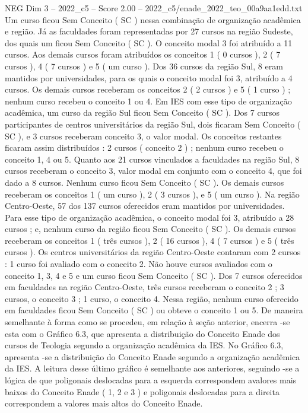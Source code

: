 \begin{textsample}{NEG Dim 3 – 2022\_c5 – Score 2.00 – 2022\_c5/enade\_2022\_teo\_00a9aa1edd.txt}
Um curso ficou Sem Conceito ( SC ) nessa combinação de organização acadêmica e região.
Já as faculdades foram representadas por 27 cursos na região Sudeste, dos quais um ficou Sem Conceito ( SC ).
O conceito modal 3 foi atribuído a 11 cursos.
Aos demais cursos foram atribuídos os conceitos 1 ( 0 cursos ), 2 ( 7 cursos ), 4 ( 7 cursos ) e 5 ( um curso ).
Dos 36 cursos da região Sul, 8 eram mantidos por universidades, para os quais o conceito modal foi 3, atribuído a 4 cursos.
Os demais cursos receberam os conceitos 2 ( 2 cursos ) e 5 ( 1 curso ) ; nenhum curso recebeu o conceito 1 ou 4.
Em IES com esse tipo de organização acadêmica, um curso da região Sul ficou Sem Conceito ( SC ).
Dos 7 cursos participantes de centros universitários da região Sul, dois ficaram Sem Conceito ( SC ), e 3 cursos receberam conceito 3, o valor modal.
Os conceitos restantes ficaram assim distribuídos : 2 cursos ( conceito 2 ) ; nenhum curso recebeu o conceito 1, 4 ou 5.
Quanto aos 21 cursos vinculados a faculdades na região Sul, 8 cursos receberam o conceito 3, valor modal em conjunto com o conceito 4, que foi dado a 8 cursos.
Nenhum curso ficou Sem Conceito ( SC ).
Os demais cursos receberam os conceitos 1 ( um curso ), 2 ( 3 cursos ), e 5 ( um curso ).
Na região Centro-Oeste, 57 dos 137 cursos oferecidos eram mantidos por universidades.
Para esse tipo de organização acadêmica, o conceito modal foi 3, atribuído a 28 cursos ; e, nenhum curso da região ficou Sem Conceito ( SC ).
Os demais cursos receberam os conceitos 1 ( três cursos ), 2 ( 16 cursos ), 4 ( 7 cursos ) e 5 ( três cursos ).
Os centros universitários da região Centro-Oeste contaram com 2 cursos : 1 curso foi avaliado com o conceito 2.
Não houve cursos avaliados com o conceito 1, 3, 4 e 5 e um curso ficou Sem Conceito ( SC ).
Dos 7 cursos oferecidos em faculdades na região Centro-Oeste, três cursos receberam o conceito 2 ; 3 cursos, o conceito 3 ; 1 curso, o conceito 4.
Nessa região, nenhum curso oferecido em faculdades ficou Sem Conceito ( SC ) ou obteve o conceito 1 ou 5.
De maneira semelhante à forma como se procedeu, em relação à seção anterior, encerra -se esta com o Gráfico 6.3, que apresenta a distribuição do Conceito Enade dos cursos de Teologia segundo a organização acadêmica da IES.
No Gráfico 6.3, apresenta -se a distribuição do Conceito Enade segundo a organização acadêmica da IES.
A leitura desse último gráfico é semelhante aos anteriores, seguindo -se a lógica de que poligonais deslocadas para a esquerda correspondem avalores mais baixos do Conceito Enade ( 1, 2 e 3 ) e poligonais deslocadas para a direita correspondem a valores mais altos do Conceito Enade.

\end{textsample}
